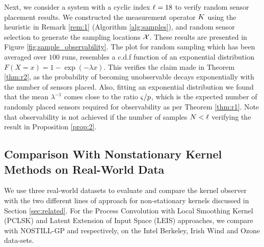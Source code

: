 Next, we  consider a system with a cyclic index $\ell=18$ to verify random sensor placement results. We constructed the measurement operator $K$ using the heuristic in Remark \ref{rem:1} (Algorithm \ref{alg:samples}), and random sensor selection to generate the sampling locations $\mathcal{X}$. These results are presented in Figure \ref{fig:sample_observability}. The plot for random sampling which has been averaged over $ 100 $ runs, resembles a c.d.f function of an exponential distribution $ F(X=x)=1-\exp(-\lambda x) $. This verifies the claim made in Theorem \ref{thm:r2}, as the probability of becoming unobservable decays exponentially with the number of sensors placed. Also, fitting an exponential distribution we found that the mean $ \lambda^{-1}$ comes close to the ratio $ {\varsigma}/{p} $, which is the expected number of randomly placed sensors required for observability as per Theorem \ref{thm:r1}. Note that observability is not achieved if the number of samples $N < \ell$ verifying the result in Proposition \ref{prop:2}. %
 \vspace{-0.1in}
\subsection{Comparison With Nonstationary Kernel Methods on Real-World Data}\label{sec:comparison}
We use three real-world datasets to evaluate and compare the kernel observer with the two different lines of approach for non-stationary kernels  discussed in Section \ref{sec:related}. For the Process Convolution with Local Smoothing Kernel (PCLSK) and Latent Extension of Input Space (LEIS) approaches, we compare with NOSTILL-GP \cite{garg2012AAAI} and \cite{pfingsten2006nonstationary} respectively, on the Intel Berkeley, Irish Wind and Ozone data-sets. 

